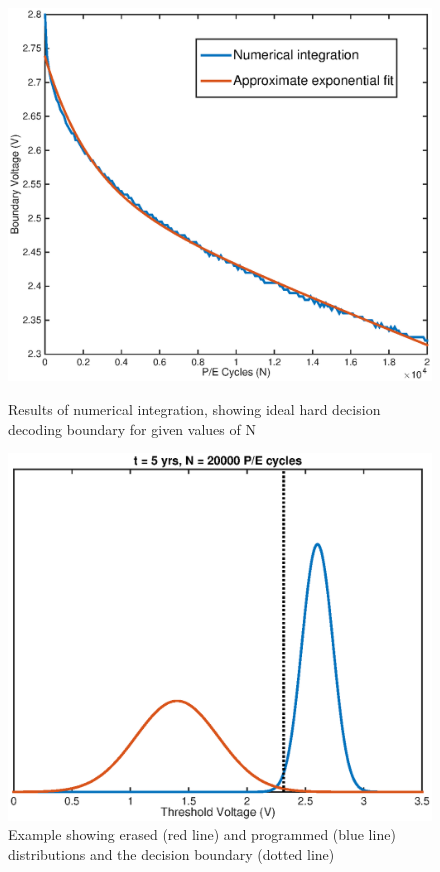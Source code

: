 \documentclass[11pt]{article}
\numberwithin{equation}{subsection}
\begin{document}
\begin{figure}[h]
\centering
{}
\centering
\includegraphics[scale=0.52]{variable_boundary_graph}
\caption{Results of numerical integration, showing ideal hard decision decoding boundary for given values of N}
\label{fig:hard_decision_variable_boundary}
\endminipage\hfill
{}
\centering
\includegraphics[scale=0.6]{variable_boundary_example}
\caption{Example showing erased (red line) and programmed (blue line) distributions and the decision boundary (dotted line)}
\label{fig:hard_decision_variable_example}
\endminipage
\end{figure}
\end{document}
